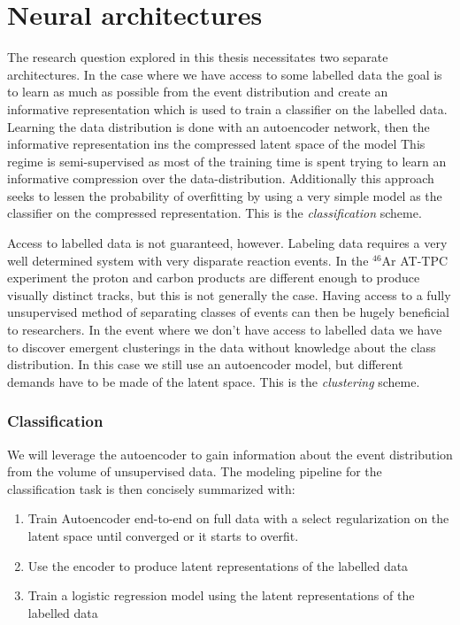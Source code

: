 
\chapter{Neural architectures}\label{ch:architectures}

The research question explored in this thesis necessitates two separate architectures. In the case where we have access to some labelled data the goal is to learn as much as possible from the event distribution and create an informative representation which is used to train a classifier on the labelled data. Learning the data distribution is done with an autoencoder network, then the informative representation ins the compressed latent space of the model This regime is semi-supervised as most of the training time is spent trying to learn an informative compression over the data-distribution. Additionally this approach seeks to lessen the probability of overfitting by using a very simple model as the classifier on the compressed representation. This is the \textit{classification} scheme.

 Access to labelled data is not guaranteed, however. Labeling data requires a very well determined system with very disparate reaction events. In the ${}^{46}$Ar AT-TPC experiment the proton and carbon products are different enough to produce visually distinct tracks, but this is not generally the case. Having access to a fully unsupervised method of separating classes of events can then be hugely beneficial to researchers. In the event where we don't have access to labelled data we have to discover emergent clusterings in the data without knowledge about the class  distribution. In this case we still use an autoencoder model, but different demands have to be made of the latent space. This is the \textit{clustering} scheme. 

\subsection{Classification}
We will leverage  the autoencoder to gain information about the event distribution from the volume of unsupervised data. The modeling pipeline for the classification task is then concisely summarized with: 

\begin{enumerate}
\item Train Autoencoder end-to-end on full data with a select regularization on the latent space until converged or it starts to overfit. 
\item Use the encoder to produce latent representations of the labelled data 
\item Train a logistic regression model using the latent representations of the labelled data 
\end{enumerate}


